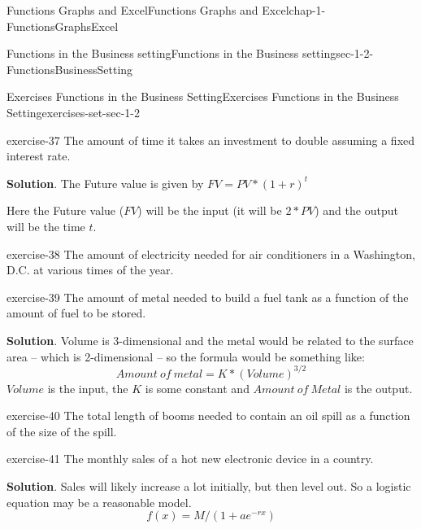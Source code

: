 \documentclass[oneside,10pt,]{book}
\numberwithin{equation}{section}
\begin{document}
\begin{chapterptx}{Functions Graphs and Excel}{}{Functions Graphs and Excel}{}{}{chap-1-FunctionsGraphsExcel}
\begin{sectionptx}{Functions in the Business setting}{}{Functions in the Business setting}{}{}{sec-1-2-FunctionsBusinessSetting}
\begin{exercises-subsection-numberless}{Exercises  Functions in the Business Setting}{}{Exercises  Functions in the Business Setting}{}{}{exercises-set-sec-1-2}
\begin{divisionexercise}{17}{}{}{exercise-37}%
\hypertarget{p-212}{}%
The amount of time it takes an investment to double assuming a fixed interest rate.%
\par\smallskip%
\noindent\textbf{Solution}.\hypertarget{solution-19}{}\quad%
\hypertarget{p-213}{}%
The Future value is given by \(FV=PV*(1+r)^t\)%
\par
\hypertarget{p-214}{}%
Here the Future value (\(FV\)) will be the input (it will be \(2*PV\)) and the output will be the time \(t\).%
\end{divisionexercise}%
\begin{divisionexercise}{18}{}{}{exercise-38}%
\hypertarget{p-215}{}%
The amount of electricity needed for air conditioners in a Washington, D.C. at various times of the year.%
\end{divisionexercise}%
\begin{divisionexercise}{19}{}{}{exercise-39}%
\hypertarget{p-216}{}%
The amount of metal needed to build a fuel tank as a function of the amount of fuel to be stored.%
\par\smallskip%
\noindent\textbf{Solution}.\hypertarget{solution-20}{}\quad%
\hypertarget{p-217}{}%
Volume is 3-dimensional and the metal would be related to the surface area – which is 2-dimensional – so the formula would be something like:%
%
\begin{equation*}
Amount\ of\ metal=K*(Volume)^{3/2}
\end{equation*}
\hypertarget{p-218}{}%
\(Volume\) is the input, the \(K\) is some constant and \(Amount\ of\ Metal\) is the output.%
\end{divisionexercise}%
\begin{divisionexercise}{20}{}{}{exercise-40}%
\hypertarget{p-219}{}%
The total length of booms needed to contain an oil spill as a function of the size of the spill.%
\end{divisionexercise}%
\begin{divisionexercise}{21}{}{}{exercise-41}%
\hypertarget{p-220}{}%
The monthly sales of a hot new electronic device in a country.%
\par\smallskip%
\noindent\textbf{Solution}.\hypertarget{solution-21}{}\quad%
\hypertarget{p-221}{}%
Sales will likely increase a lot initially, but then level out. So a logistic equation may be a reasonable model.%
%
\begin{equation*}
f(x)=  M/(1+a e^{-rx} )
\end{equation*}
\end{divisionexercise}%

\end{exercises-subsection-numberless}
\end{sectionptx}
\end{chapterptx}
\end{document}
